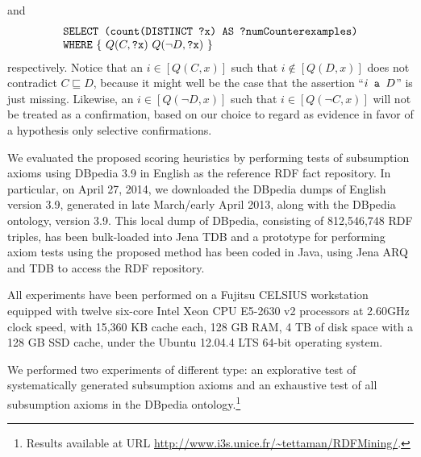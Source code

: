 \documentclass{llncs}
\begin{document}
and
\begin{equation}
  \begin{minipage}[c]{5in}
    \begin{tabbing}
      \quad\=\quad\=\quad\=\kill
      \texttt{SELECT (count(DISTINCT ?x) AS ?numCounterexamples)}\\
      \texttt{WHERE} \{ $Q(C, \mbox{\tt ?x})$ $Q(\neg D, \mbox{\tt ?x})$ \}
    \end{tabbing}
  \end{minipage}
\end{equation}
respectively.
Notice that an $i \in [Q(C, x)]$ such that $i \notin [Q(D, x)]$
does not contradict $C \sqsubseteq D$, because it might well be the case
that the assertion ``$i \mbox{\tt\ a } D$'' is just missing.
Likewise, an $i \in [Q(\neg D, x)]$ such that $i \in [Q(\neg C, x)]$
will not be treated as a confirmation, based on our choice to regard as
evidence in favor of a hypothesis only selective confirmations.

We evaluated the proposed scoring heuristics by performing tests of subsumption
axioms using DBpedia 3.9 in English as the reference RDF fact repository.
In particular, on April 27, 2014, we downloaded the DBpedia dumps of English version 3.9,
generated in late March/early April 2013, along with the DBpedia ontology, version 3.9.
This local dump of DBpedia, consisting of 812,546,748 RDF triples,
has been bulk-loaded into Jena TDB and a prototype
for performing axiom tests using the proposed method has been coded in Java,
using Jena ARQ and TDB to access the RDF repository.

All experiments have been performed on a Fujitsu CELSIUS workstation equipped
with twelve six-core Intel Xeon CPU E5-2630 v2 processors at 2.60GHz clock speed,
with 15,360 KB cache each, 128 GB RAM,
4 TB of disk space with a 128 GB SSD cache,
under the Ubuntu  12.04.4 LTS 64-bit operating system.


We performed two experiments of different type: an explorative test of systematically
generated subsumption axioms and an exhaustive test of all subsumption axioms
in the DBpedia ontology.\footnote{Results available
at URL \url{http://www.i3s.unice.fr/~tettaman/RDFMining/}.}
\end{document}
